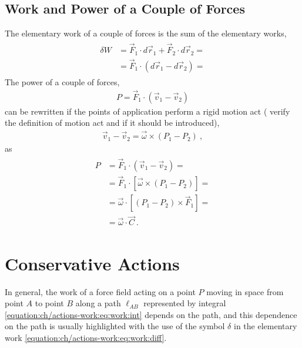 \documentclass[letterpaper,10pt,english]{jupyterBook}
\begin{document}
\subsection{Work and Power of a Couple of Forces}
\label{\detokenize{ch/actions-work:work-and-power-of-a-couple-of-forces}}
\sphinxAtStartPar
{} The elementary work of a couple of forces is the sum of the elementary works,
\begin{equation*}
\begin{split}\begin{aligned}
  \delta W & = \vec{F}_1 \cdot d \vec{r}_1 + \vec{F}_2 \cdot d \vec{r}_2 = \\
           & = \vec{F}_1 \cdot ( d \vec{r}_1 - d \vec{r}_2 ) = 
\end{aligned}\end{split}
\end{equation*}
\sphinxAtStartPar
{} The power of a couple of forces,
\begin{equation*}
\begin{split}P = \vec{F}_1 \cdot (\vec{v}_1 - \vec{v}_2)\end{split}
\end{equation*}
\sphinxAtStartPar
can be rewritten if the points of application perform a rigid motion act ( verify the definition of motion act and if it should be introduced),
\begin{equation*}
\begin{split}\vec{v}_1 - \vec{v}_2 = \vec{\omega} \times (P_1 - P_2) \ ,\end{split}
\end{equation*}
\sphinxAtStartPar
as
\begin{equation*}
\begin{split}\begin{aligned}
  P & =  \vec{F}_1 \cdot (\vec{v}_1 - \vec{v}_2) = \\
    & =  \vec{F}_1 \cdot \left[ \vec{\omega} \times (P_1 - P_2) \right] = \\
    & =  \vec{\omega} \cdot \left[ (P_1 - P_2) \times \vec{F}_1\right] = \\
    & =  \vec{\omega} \cdot \vec{C} \ . 
\end{aligned}\end{split}
\end{equation*}
\sphinxstepscope


\section{Conservative Actions}
\label{\detokenize{ch/actions-conservative:conservative-actions}}\label{\detokenize{ch/actions-conservative:classical-mechanics-actions-conservative}}\label{\detokenize{ch/actions-conservative::doc}}
\sphinxAtStartPar
In general, the work of a force field acting on a point \(P\) moving in space from point \(A\) to point \(B\) along a path \(\ell_{AB}\) represented by integral \eqref{equation:ch/actions-work:eq:work:int} depends on the path, and this dependence on the path is usually highlighted with the use of the symbol \(\delta\) in the elementary work \eqref{equation:ch/actions-work:eq:work:diff}.
\end{document}
